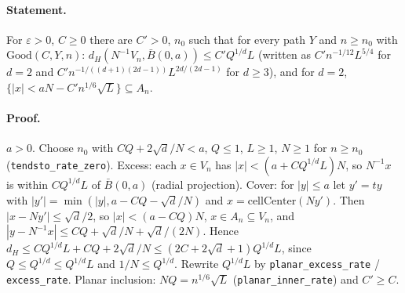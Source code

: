 \paragraph{Statement.} For $\varepsilon>0$, $C\geq0$ there are $C'>0$, $n_0$ such that for every path $Y$ and $n\geq n_0$ with $\mathrm{Good}(C,Y,n)$:
$d_H(N^{-1}V_n,\bar B(0,a))\leq C'Q^{1/d}L$ (written as $C'n^{-1/12}L^{5/4}$ for $d=2$ and $C'n^{-1/((d+1)(2d-1))}L^{2d/(2d-1)}$ for $d\geq3$), and for $d=2$,
$\{|x|<aN-C'n^{1/6}\sqrt L\}\subseteq A_n$.
\paragraph{Proof.} $a>0$. Choose $n_0$ with $CQ+2\sqrt d/N<a$, $Q\leq1$, $L\geq1$, $N\geq1$ for $n\geq n_0$ (\texttt{tendsto\_rate\_zero}).
Excess: each $x\in V_n$ has $|x|<(a+CQ^{1/d}L)N$, so $N^{-1}x$ is within $CQ^{1/d}L$ of $\bar B(0,a)$ (radial projection).
Cover: for $|y|\leq a$ let $y'=ty$ with $|y'|=\min(|y|,a-CQ-\sqrt d/N)$ and $x=\mathrm{cellCenter}(Ny')$. Then $|x-Ny'|\leq\sqrt d/2$, so $|x|<(a-CQ)N$, $x\in A_n\subseteq V_n$,
and $|y-N^{-1}x|\leq CQ+\sqrt d/N+\sqrt d/(2N)$. Hence $d_H\leq CQ^{1/d}L+CQ+2\sqrt d/N\leq(2C+2\sqrt d+1)Q^{1/d}L$, since $Q\leq Q^{1/d}\leq Q^{1/d}L$ and $1/N\leq Q^{1/d}$.
Rewrite $Q^{1/d}L$ by \texttt{planar\_excess\_rate} / \texttt{excess\_rate}. Planar inclusion: $NQ=n^{1/6}\sqrt L$ (\texttt{planar\_inner\_rate}) and $C'\geq C$.
